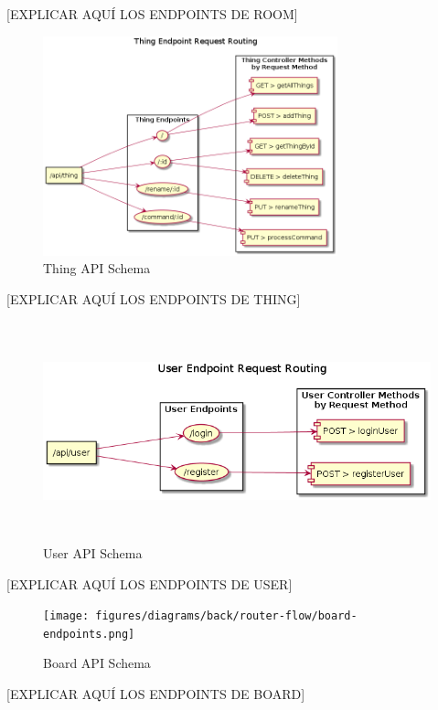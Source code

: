 [EXPLICAR AQUÍ LOS ENDPOINTS DE ROOM]

\begin{figure}[hbt!]
\centering
\includegraphics[height=2.5in]{figures/diagrams/back/router-flow/thing-endpoints.png}
\caption[thing-endpoints]{Thing API Schema\footnotemark}
\end{figure}

[EXPLICAR AQUÍ LOS ENDPOINTS DE THING]

\begin{figure}[hbt!]
\centering
\includegraphics[height=2.5in]{figures/diagrams/back/router-flow/user-endpoints.png}
\caption[user-endpoints]{User API Schema\footnotemark}
\end{figure}

[EXPLICAR AQUÍ LOS ENDPOINTS DE USER]

\begin{figure}[hbt!]
\centering
\texttt{[image: figures/diagrams/back/router-flow/board-endpoints.png]}
\caption[board-endpoints]{Board API Schema\footnotemark}
\end{figure}

[EXPLICAR AQUÍ LOS ENDPOINTS DE BOARD]

